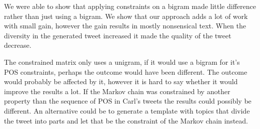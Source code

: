 \documentclass[a4paper,12pt]{article}
\begin{document}
We were able to show that applying constraints on a bigram made little difference rather than just using a bigram. We show that our approach adds a lot of work with small gain, however the gain results in mostly nonsensical text. When the diversity in the generated tweet increased it made the quality of the tweet decrease.

The constrained matrix only uses a unigram, if it would use a bigram for it's POS constraints, perhaps the outcome would have been different. The outcome would probably be affected by it, however it is hard to say whether it would improve the results a lot. If the Markov chain was constrained by another property than the sequence of POS in Carl's tweets the results could possibly be different. An alternative could be to generate a template with topics that divide the tweet into parts and let that be the constraint of the Markov chain instead.




\end{document}
